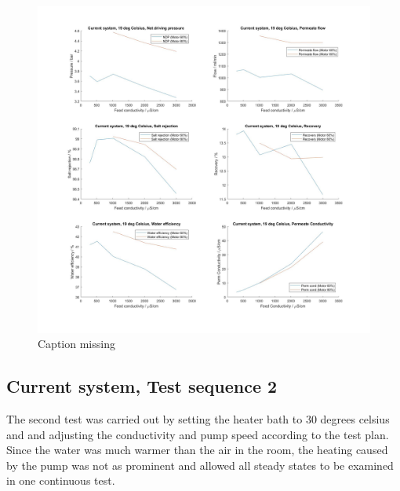 \begin{figure}[H]
    \centering
    \includegraphics[width=1.1\textwidth]{Key20}
    \caption{Caption missing}
    \label{fig:K20}
\end{figure}

\newpage

\subsection{Current system, Test sequence 2}

The second test was carried out by setting the heater bath to 30 degrees celsius and and adjusting the conductivity and pump speed according to the test plan. Since the water was much warmer than the air in the room, the heating caused by the pump was not as prominent and allowed all steady states to be examined in one continuous test.

